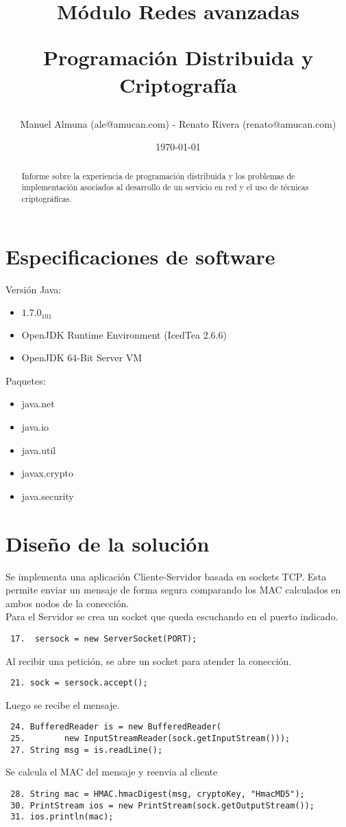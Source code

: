 \documentclass[letter, 10pt]{article}
\begin{document}
\title{Módulo Redes avanzadas \\ \begin{Large}Programación Distribuida y Criptografía\end{Large}}
\author{Manuel Almuna (ale@amucan.com) - Renato Rivera (renato@amucan.com)}
\date{\today}
\maketitle

\begin{abstract}
Informe sobre la experiencia de programación distribuida y 	
los problemas de implementación asociados al desarrollo de un servicio en red y	el	
uso de técnicas criptográficas.

\end{abstract}
\section{Especificaciones de software}
Versión Java: 
\begin{itemize}
 \item $1.7.0_101$
 \item OpenJDK Runtime Environment (IcedTea 2.6.6)
 \item OpenJDK 64-Bit Server VM
\end{itemize}
Paquetes:
\begin{itemize}
 \item java.net
 \item java.io
 \item java.util
 \item javax.crypto
 \item java.security
\end{itemize}


\section{Diseño de la solución}
Se implementa una aplicación Cliente-Servidor basada en sockets TCP. Esta permite enviar un mensaje de forma
segura comparando los MAC calculados en ambos nodos de la conección.
\newline
\\
Para el Servidor se crea un socket que queda escuchando en el puerto indicado.
\begin{verbatim}
 17.  sersock = new ServerSocket(PORT);
\end{verbatim}
Al recibir una petición, se abre un socket para atender la conección.  
\begin{verbatim}
 21. sock = sersock.accept();
\end{verbatim}
Luego se recibe el mensaje.
\begin{verbatim}
 24. BufferedReader is = new BufferedReader(
 25.        new InputStreamReader(sock.getInputStream()));
 27. String msg = is.readLine();
\end{verbatim}
Se calcula el MAC del mensaje y reenvia al cliente
\begin{verbatim}
 28. String mac = HMAC.hmacDigest(msg, cryptoKey, "HmacMD5"); 
 30. PrintStream ios = new PrintStream(sock.getOutputStream());
 31. ios.println(mac);
\end{verbatim}
\end{document}
